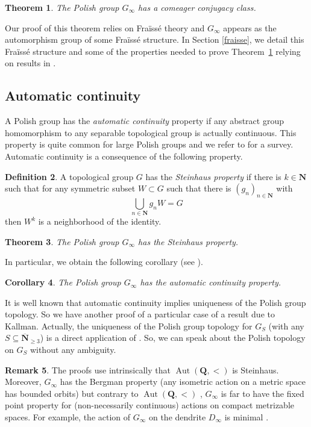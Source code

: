 \documentclass[JEP,XML,SOM,Unicode,NoFloatCountersInSection]{cedram}
\theoremstyle{plain}
\newtheorem{thm}{Theorem}[section]
\newtheorem{cor}[thm]{Corollary}
\theoremstyle{definition}
\newtheorem{defn}[thm]{Definition}
\newtheorem{rem}[thm]{Remark}
\newcommand{\NN}{\mathbf{N}}
\newcommand{\QQ}{\mathbf{Q}}
\DeclareMathOperator{\Aut}{Aut}
\begin{document}
\begin{thm}\label{ccc}The Polish group $G_\infty$ has a comeager conjugacy class.
\end{thm}

Our proof of this theorem relies on Fraïssé theory and $G_\infty$ appears as the automorphism group of some Fraïssé structure. In Section \ref{fraisse}, we detail this Fraïssé structure and some of the properties needed to prove Theorem~\ref{ccc} relying on results in \cite{MR1162490,Kechris-Rosendal}.

\subsection{Automatic continuity}A Polish group has the \emph{automatic continuity} property if any abstract group homomorphism to any separable topological group is actually continuous. This property is quite common for large Polish groups and we refer to \cite{rosendal2009automatic} for a survey. Automatic continuity is a consequence of the following property.

\begin{defn}\label{Stein}A topological group $G$ has the \emph{Steinhaus property} if there is $k\in\NN$ such that for any symmetric subset $W\subset G$ such that there is $(g_n)_{n\in\NN}$ with
\[
\bigcup_{n\in\NN}g_nW=G
\]
then $W^k$ is a neighborhood of the identity.
\end{defn}

\begin{thm}\label{144-Steinhaus}The Polish group $G_\infty$ has the Steinhaus property.
\end{thm}

In particular, we obtain the following corollary (see \cite[Prop.\,2]{Rosendal-Solecki}).
\begin{cor}\label{autcont}The Polish group $G_\infty$ has the automatic continuity property.
\end{cor}

It is well known that automatic continuity implies uniqueness of the Polish group topology. So we have another proof of a particular case of a result due to Kallman. Actually, the uniqueness of the Polish group topology for $G_S$ (with any $S\subseteq\overline{\NN}_{\geq3}$) is a direct application of \cite[Th.\,1.1]{MR831205}. So, we can speak about the Polish topology on $G_S$ without any ambiguity.

\begin{rem} The proofs use intrinsically that $\Aut(\QQ,<)$ is Steinhaus. Moreover, $G_\infty$ has the Bergman property (any isometric action on a metric space has bounded orbits) but contrary to $\Aut(\QQ,<)$ \cite[Cor.\,7]{Rosendal-Solecki}, $G_\infty$ is far to have the fixed point property for (non-necessarily continuous) actions on compact metrizable spaces. For example, the action of $G_\infty$ on the dendrite $D_\infty$ is minimal \cite{DM_dendritesII}.
\end{rem}
\end{document}

